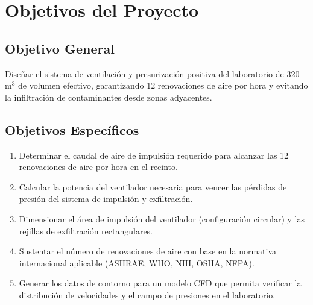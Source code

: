 \section{Objetivos del Proyecto}

\subsection{Objetivo General}

Diseñar el sistema de ventilación y presurización positiva del laboratorio de 320 m$^3$ de volumen efectivo, garantizando 12 renovaciones de aire por hora y evitando la infiltración de contaminantes desde zonas adyacentes.

\subsection{Objetivos Específicos}

\begin{enumerate}
	\item Determinar el caudal de aire de impulsión requerido para alcanzar las 12 renovaciones de aire por hora en el recinto.
	\item Calcular la potencia del ventilador necesaria para vencer las pérdidas de presión del sistema de impulsión y exfiltración.
	\item Dimensionar el área de impulsión del ventilador (configuración circular) y las rejillas de exfiltración rectangulares.
	\item Sustentar el número de renovaciones de aire con base en la normativa internacional aplicable (ASHRAE, WHO, NIH, OSHA, NFPA).
	\item Generar los datos de contorno para un modelo CFD que permita verificar la distribución de velocidades y el campo de presiones en el laboratorio.
\end{enumerate}
